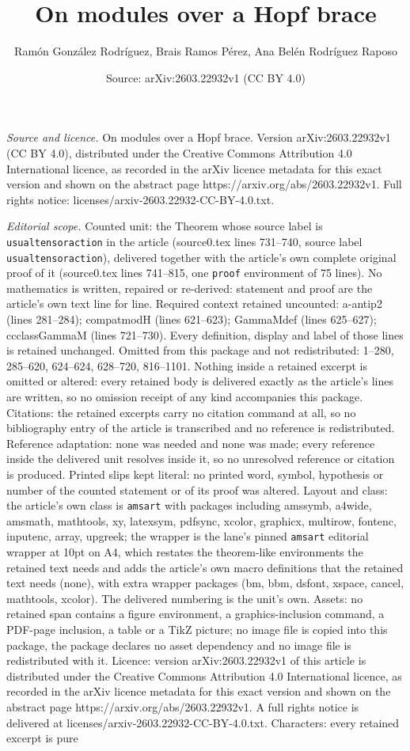 \documentclass[10pt,a4paper]{amsart}
\title[On modules over a Hopf brace]{On modules over a Hopf brace}
\author{Ram\'on Gonz\'alez Rodr\'iguez, Brais Ramos P\'erez, Ana Bel\'en Rodr\'iguez Raposo}
\date{Source: arXiv:2603.22932v1 (CC BY 4.0)}
\begin{document}
\maketitle

\noindent\emph{Source and licence.} On modules over a Hopf brace. Version arXiv:2603.22932v1 (CC BY 4.0), distributed under the Creative Commons Attribution 4.0 International licence, as recorded in the arXiv licence metadata for this exact version and shown on the abstract page https://arxiv.org/abs/2603.22932v1. Full rights notice: licenses/arxiv-2603.22932-CC-BY-4.0.txt.\par\smallskip

\noindent\textit{Editorial scope.} Counted unit: the Theorem whose source label is \texttt{usualtensoraction} in the article (source0.tex lines 731--740, source label \texttt{usualtensoraction}), delivered together with the article's own complete original proof of it (source0.tex lines 741--815, one \texttt{proof} environment of 75 lines). No mathematics is written, repaired or re-derived: statement and proof are the article's own text line for line. Required context retained uncounted: a-antip2 (lines 281--284); compatmodH (lines 621--623); GammaMdef (lines 625--627); ccclassGammaM (lines 721--730). Every definition, display and label of those lines is retained unchanged. Omitted from this package and not redistributed: 1--280, 285--620, 624--624, 628--720, 816--1101. Nothing inside a retained excerpt is omitted or altered: every retained body is delivered exactly as the article's lines are written, so no omission receipt of any kind accompanies this package. Citations: the retained excerpts carry no citation command at all, so no bibliography entry of the article is transcribed and no reference is redistributed. Reference adaptation: none was needed and none was made; every reference inside the delivered unit resolves inside it, so no unresolved reference or citation is produced. Printed slips kept literal: no printed word, symbol, hypothesis or number of the counted statement or of its proof was altered. Layout and class: the article's own class is \texttt{amsart} with packages including amssymb, a4wide, amsmath, mathtools, xy, latexsym, pdfsync, xcolor, graphicx, multirow, fontenc, inputenc, array, upgreek; the wrapper is the lane's pinned \texttt{amsart} editorial wrapper at 10pt on A4, which restates the theorem-like environments the retained text needs and adds the article's own macro definitions that the retained text needs (none), with extra wrapper packages (bm, bbm, dsfont, xspace, cancel, mathtools, xcolor). The delivered numbering is the unit's own. Assets: no retained span contains a figure environment, a graphics-inclusion command, a PDF-page inclusion, a table or a TikZ picture; no image file is copied into this package, the package declares no asset dependency and no image file is redistributed with it. Licence: version arXiv:2603.22932v1 of this article is distributed under the Creative Commons Attribution 4.0 International licence, as recorded in the arXiv licence metadata for this exact version and shown on the abstract page https://arxiv.org/abs/2603.22932v1. A full rights notice is delivered at licenses/arxiv-2603.22932-CC-BY-4.0.txt. Characters: every retained excerpt is pure 
\end{document}
